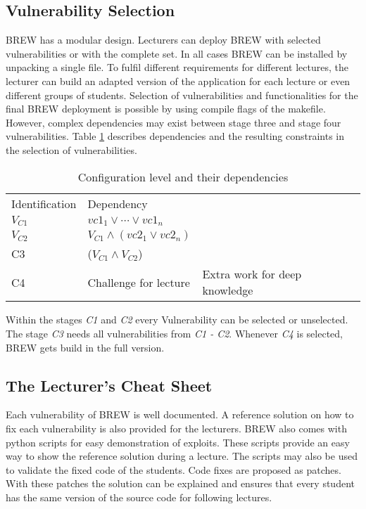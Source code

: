 \documentclass{llncs}
\begin{document}
\subsection{Vulnerability Selection}
BREW has a modular design.
Lecturers can deploy BREW with selected vulnerabilities or with the complete set.
In all cases BREW can be installed by unpacking a single file.
To fulfil different requirements for different lectures, the lecturer can build an adapted version of the application for each lecture or even different groups of students.
Selection of vulnerabilities and functionalities for the final BREW deployment is possible by using compile flags of the makefile.
However, complex dependencies may exist between stage three and stage four vulnerabilities.
Table \ref{tab:conflevel} describes dependencies and the resulting constraints in the selection of vulnerabilities.

\begin{table}
\centering
\caption{Configuration level and their dependencies}
\label{tab:conflevel}
\begin{tabular}{llllll}
\hline\noalign{\smallskip}
Identification & Dependency\\
\noalign{\smallskip}
\hline
\noalign{\smallskip}
$V_{C1}$ & $vc1_1 \vee \cdots \vee vc1_n$\\
$V_{C2}$ & $V_{C1} \wedge (vc2_1 \vee vc2_n)$\\
C3 & ($V_{C1} \wedge V_{C2}$)\\
C4 & Challenge for lecture & Extra work for deep knowledge\\
\hline
\end{tabular}
\end{table}
Within the stages {\em C1} and {\em C2} every Vulnerability can be selected or unselected. The stage {\em C3} needs all vulnerabilities from {\em C1 - C2}. Whenever {\em C4} is selected, BREW gets build in the full version.

\subsection{The Lecturer's Cheat Sheet}
Each vulnerability of BREW is well documented. A reference solution on how to fix each vulnerability is also provided for the lecturers. BREW also comes with python scripts for easy demonstration of exploits. These scripts provide an easy way to show the reference solution during a lecture. The scripts may also be used to validate the fixed code of the students. Code fixes are proposed as patches. With these patches the solution can be explained and ensures that every student has the same version of the source code for following lectures.
\end{document}
